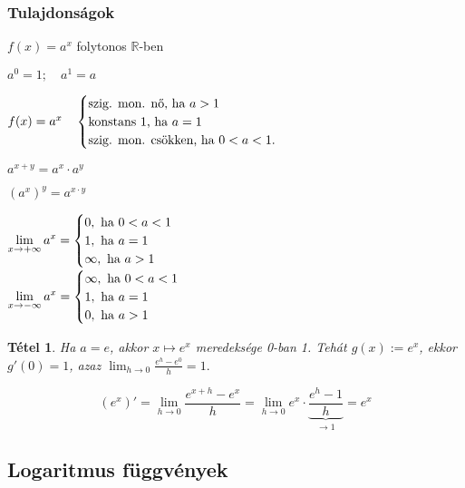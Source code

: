 \documentclass[a4paper,12pt,twoside]{book}
\newtheorem{tetel}{Tétel}[chapter]
\theoremstyle{break}
\theoremstyle{plain}
\begin{document}
\subsubsection{Tulajdonságok}
\begin{enumerate*}
 \item $f(x) = a^x$ folytonos $\mathbb{R}$-ben
 \item $a^0 = 1; \quad a^1 = a$
 \item $f(x) = a^x \quad \begin{cases}
                           \hbox{szig. mon. nő, ha } a>1\\
			   \hbox{konstans 1, ha } a=1\\
			   \hbox{szig. mon. csökken, ha } 0<a<1.
                         \end{cases}$
 \item $a^{x+y} = a^x\cdot a^y$
 \item $(a^x)^y = a^{x\cdot y}$
 \item $\displaystyle \lim_{x\to +\infty} a^x =
  \begin{cases}
    0, \hbox{ ha } 0<a<1\\
    1, \hbox{ ha } a=1\\
    \infty, \hbox{ ha } a>1
  \end{cases}$\\
  $\displaystyle \lim_{x\to -\infty} a^x =
  \begin{cases}
    \infty, \hbox{ ha } 0<a<1\\
    1, \hbox{ ha } a=1\\
    0, \hbox{ ha } a>1
  \end{cases}$
\end{enumerate*}

\begin{tetel} Ha $a=e$, akkor $x\mapsto e^x$ meredeksége 0-ban 1. Tehát $g(x) := e^x$, ekkor $g'(0) = 1$, azaz $\displaystyle \lim_{h\to 0} \frac{e^h-e^0}{h} = 1.$
\end{tetel}
\addtocounter{biz}{1}

\[(e^x)' = \lim_{h\to 0} \frac{e^{x+h}-e^{x}}{h} = \lim_{h\to 0} e^x\cdot \underbrace{\frac{e^h-1}{h}}_{\to 1} = \boxed{e^x}\]

\subsection{Logaritmus függvények}
\end{document}
